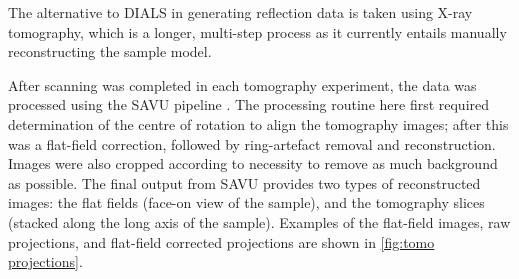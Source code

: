 
The alternative to DIALS in generating reflection data is taken using X-ray tomography, which is a longer, multi-step process as it currently entails manually reconstructing the sample model.

After scanning was completed in each tomography experiment, the data was processed using the SAVU pipeline \cite{Kazantsev2022}. The processing routine here first required determination of the centre of rotation to align the tomography images; after this was a flat-field correction, followed by ring-artefact removal and reconstruction. Images were also cropped according to necessity to remove as much background as possible. The final output from SAVU provides two types of reconstructed images: the flat fields (face-on view of the sample), and the tomography slices (stacked along the long axis of the sample). Examples of the flat-field images, raw projections, and flat-field corrected projections are shown in \cref{fig:tomo projections}.


